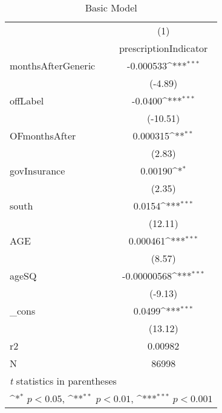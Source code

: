 \begin{table}[htbp]\centering
\def\sym#1{\ifmmode^{#1}\else\(^{#1}\)\fi}
\caption{Basic Model\label{tab1}}
\begin{tabular}{l*{1}{c}}
\hline\hline
            &\multicolumn{1}{c}{(1)}\\
            &\multicolumn{1}{c}{prescriptionIndicator}\\
\hline
monthsAfterGeneric&   -0.000533\sym{***}\\
            &     (-4.89)         \\
[1em]
offLabel    &     -0.0400\sym{***}\\
            &    (-10.51)         \\
[1em]
OFmonthsAfter&    0.000315\sym{**} \\
            &      (2.83)         \\
[1em]
govInsurance&     0.00190\sym{*}  \\
            &      (2.35)         \\
[1em]
south       &      0.0154\sym{***}\\
            &     (12.11)         \\
[1em]
AGE         &    0.000461\sym{***}\\
            &      (8.57)         \\
[1em]
ageSQ       & -0.00000568\sym{***}\\
            &     (-9.13)         \\
[1em]
\_cons      &      0.0499\sym{***}\\
            &     (13.12)         \\
\hline
r2          &     0.00982         \\
N           &       86998         \\
\hline\hline
\multicolumn{2}{l}{\footnotesize \textit{t} statistics in parentheses}\\
\multicolumn{2}{l}{\footnotesize \sym{*} \(p<0.05\), \sym{**} \(p<0.01\), \sym{***} \(p<0.001\)}\\
\end{tabular}
\end{table}
